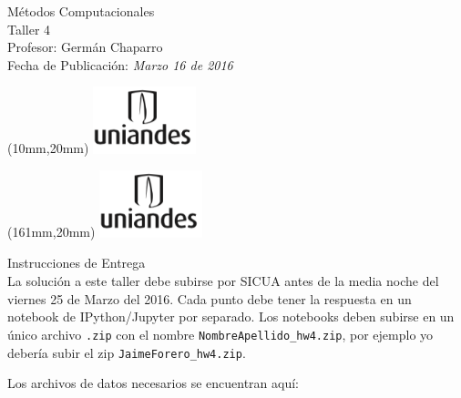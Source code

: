 \documentclass[11pt,letterpaper]{exam}
\begin{document}
\begin{center}
{\Large Métodos Computacionales} \\
Taller 4 \\
Profesor: Germán Chaparro\\
Fecha de Publicación: {\small \it Marzo 16 de 2016}\\
\end{center}

\begin{textblock*}{40mm}(10mm,20mm)
  \includegraphics[width=3cm]{logoUniandes.png}
\end{textblock*}

\begin{textblock*}{40mm}(161mm,20mm)
  \includegraphics[width=3cm]{logoUniandes.png}
\end{textblock*}

\vspace{0.5cm}

{\Large Instrucciones de Entrega}\\

\noindent
La solución a este taller debe subirse por SICUA antes de la media noche
del viernes 25 de Marzo del 2016.
\noindent
Cada punto debe tener la respuesta en un notebook de IPython/Jupyter por
separado. Los notebooks deben subirse en un \'unico archivo
\verb".zip" con el nombre \verb"NombreApellido_hw4.zip", por ejemplo
yo deber\'ia subir el zip \verb"JaimeForero_hw4.zip".

\noindent
Los archivos de datos necesarios se encuentran aqu\'i:
\end{document}
